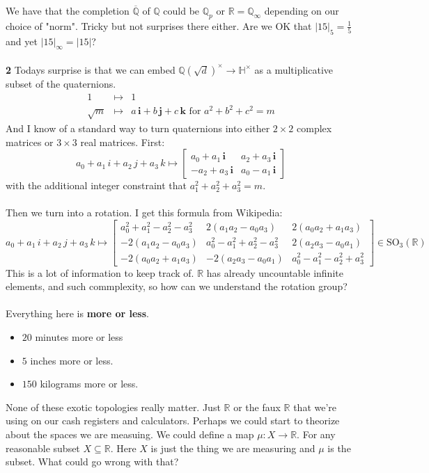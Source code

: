 \documentclass[12pt]{article}
\begin{document}
We have that the completion $\overline{\mathbb{Q}}$ of $\mathbb{Q}$ could be $\mathbb{Q}_p$ or $\mathbb{R} = \mathbb{Q}_\infty$  depending on our choice of "norm".  Tricky but not surprises there either. Are we OK that $|15|_5 = \frac{1}{5}$ and yet $|15|_\infty = |15|$? \\ \\
\textbf{2} Todays surprise is that we can embed $\mathbb{Q}(\sqrt{d})^\times \to \mathbb{H}^\times$ as a multiplicative subset of the quaternions. 
\begin{eqnarray*}
1 &\mapsto& 1 \\
\sqrt{m} &\mapsto& a \,\mathbf{i} + b \,\mathbf{j}+c\,\mathbf{k} \text{ for }a^2 + b^2 + c^2 = m
\end{eqnarray*}
And I know of a standard way to turn quaternions into either $2 \times 2$ complex matrices or $3 \times 3$ real matrices.  First:
$$ a_0 + a_1 \, i + a_2 \, j + a_3 \, k \mapsto \left[ 
\begin{array}{rr} a_0 + a_1 \, \textbf{i} & a_2 + a_3 \, \textbf{i} \\
- a_2 + a_3 \, \textbf{i} & a_0 - a_1 \, \textbf{i} \end{array}\right]$$
with the additional integer constraint that $a_1^2 + a_2^2 + a_3^2 = m$. \\ \\
Then we turn into a rotation. I get this formula from Wikipedia:
$$a_0 + a_1 \, i + a_2 \, j + a_3 \, k
\mapsto \left[ \begin{array}{cccc}
a_0^2 + a_1^2 - a_2^2 - a_3^2 & 2(a_1 a_2 - a_0 a_3) & 2(a_0 a_2 + a_1 a_3) \\
-2(a_1 a_2 - a_0 a_3) & a_0^2 - a_1^2 + a_2^2 - a_3^2 & 2(a_2 a_3 - a_0 a_1) \\
-2(a_0 a_2 + a_1 a_3) & -2(a_2 a_3 - a_0 a_1) & a_0^2 - a_1^2 - a_2^2 + a_3^2 \end{array} \right] \in \text{SO}_3(\mathbb{R}) $$
This is a lot of information to keep track of.  $\mathbb{R}$ has already uncountable infinite elements, and such commplexity, so how can we understand the rotation group? \\ \\
Everything here is \textbf{more or less}.  
\begin{itemize}
\item $20$ minutes more or less
\item $5$ inches more or less.  
\item $150$ kilograms more or less.
\end{itemize}
None of these exotic topologies really matter.  Just $\mathbb{R}$ or the faux $\mathbb{R}$ that we're using on our cash registers and calculators.
  Perhaps we could start to theorize about the spaces we are measuing.  We could define a map $ \mu: X \to \mathbb{R}$.  For any reasonable subset $X \subseteq \mathbb{R}$.  Here $X$ is just the thing we are measuring and $\mu$ is the subset.  What could go wrong with that? 
\end{document}
